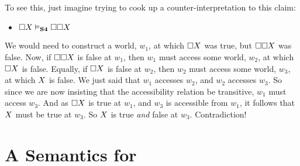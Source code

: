 To see this, just imagine trying to cook up a counter-interpretation to this claim:
\begin{itemize}
	\item[]$\Box X \vDash_{\mathbf{S4}} \Box \Box X$
\end{itemize}
We would need to construct a world, $w_1$, at which $\Box X$ was true, but $\Box \Box X$ was false. Now, if $\Box \Box X$ is false at $w_1$, then $w_1$ must access some world, $w_2$, at which $\Box X$ is false. Equally, if $\Box X$ is false at $w_2$, then $w_2$ must access some world, $w_3$, at which $X$ is false. We just said that $w_1$ accesses $w_2$, and $w_2$ accesses $w_3$. So since we are now insisting that the accessibility relation be transitive, $w_1$ must access $w_3$. And as $\Box X$ is true at $w_1$, and $w_3$ is accessible from $w_1$, it follows that $X$ must be true at $w_3$. So $X$ is true \emph{and} false at $w_3$. Contradiction!

\section{A Semantics for \mlSfive}
\label{SemanticsS5}

